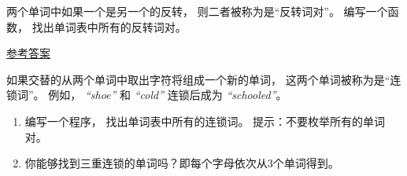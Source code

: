 \begin{exercise}


两个单词中如果一个是另一个的反转， 则二者被称为是``反转词对''。
编写一个函数， 找出单词表中所有的反转词对。

\href{http://thinkpython2.com/code/reverse_pair.py}{参考答案}

\end{exercise}

\begin{exercise}


如果交替的从两个单词中取出字符将组成一个新的单词， 这两个单词被称为是``连锁词''。
例如， {\em ``shoe''} 和 {\em ``cold''} 连锁后成为 {\em ``schooled''}。

\begin{enumerate}


\item 编写一个程序， 找出单词表中所有的连锁词。  提示：不要枚举所有的单词对。


\item 你能够找到三重连锁的单词吗？即每个字母依次从3个单词得到。

\end{enumerate}
\end{exercise}